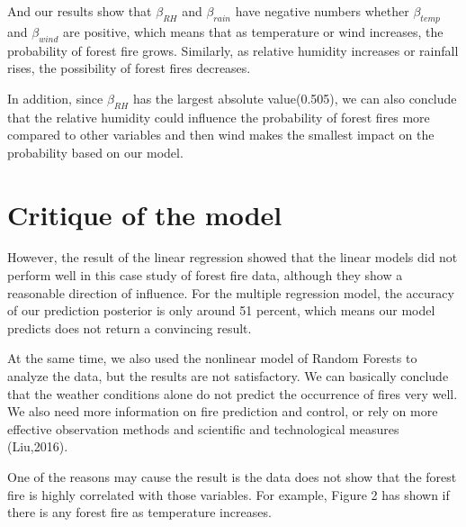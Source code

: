 \documentclass[12pt]{article}
\theoremstyle{plain}
\begin{document}
\begin{spacing}{1}
\begin{flushleft}
 And our results show that $\beta_{RH}$ and $\beta_{rain}$ have negative numbers whether $\beta_{temp}$ and $\beta_{wind}$ are positive, which means that as temperature or wind increases, the probability of forest fire grows. Similarly, as relative humidity increases or rainfall rises, the possibility of forest fires decreases. 
 
\vspace{2.0mm}
 
 In addition, since $\beta_{RH}$ has the largest absolute value(0.505), we can also conclude that the relative humidity could influence the probability of forest fires more compared to other variables and then wind makes the smallest impact on the probability based on our model.
 
 \vspace{2.0mm}
 
 
 
 
 
 \newpage
 
 \section{Critique of the model}
 
 
 However, the result of the linear regression showed that the linear models did not perform well in this case study of forest fire data, although they show a reasonable direction of influence. For the multiple regression model, the accuracy of our prediction posterior is only around 51 percent, which means our model predicts does not return a convincing result. 
 
 \vspace{2.0mm}
 
 At the same time, we also used the nonlinear model of Random Forests to analyze the data, but the results are not satisfactory. We can basically conclude that the weather conditions alone do not predict the occurrence of fires very well. We also need more information on fire prediction and control, or rely on more effective observation methods and scientific and technological measures (Liu,2016).
 
 \vspace{2.0mm}
 
 One of the reasons may cause the result is the data does not show that the forest fire is highly correlated with those variables. For example, Figure 2 has shown if there is any forest fire as temperature increases.
 
  \vspace{2.0mm}
  

\end{flushleft}
\end{spacing}
\end{document}
